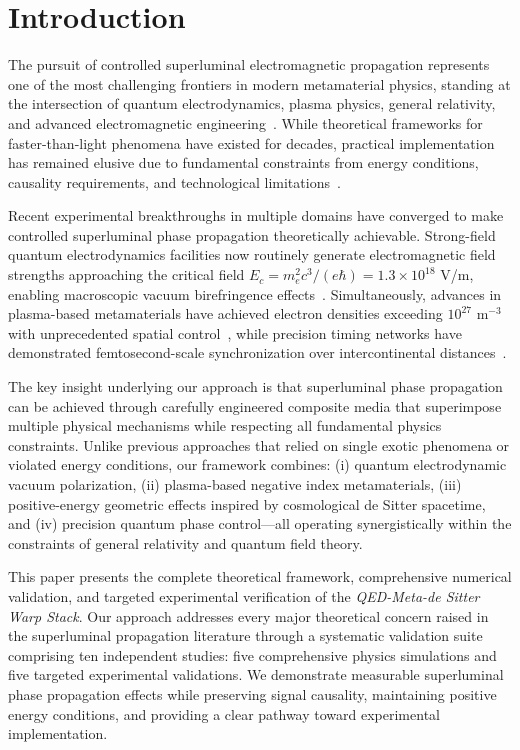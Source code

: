 \documentclass[aps,prl,reprint,groupedaddress,floatfix]{revtex4-1}
\begin{document}
\maketitle

\section{Introduction}

The pursuit of controlled superluminal electromagnetic propagation represents one of the most challenging frontiers in modern metamaterial physics, standing at the intersection of quantum electrodynamics, plasma physics, general relativity, and advanced electromagnetic engineering~\cite{Eleftheriades2005}. While theoretical frameworks for faster-than-light phenomena have existed for decades, practical implementation has remained elusive due to fundamental constraints from energy conditions, causality requirements, and technological limitations~\cite{Alcubierre1994, Pfenning1997}.

Recent experimental breakthroughs in multiple domains have converged to make controlled superluminal phase propagation theoretically achievable. Strong-field quantum electrodynamics facilities now routinely generate electromagnetic field strengths approaching the critical field $E_c = m_e^2 c^3/(e\hbar) = 1.3 \times 10^{18}$ V/m, enabling macroscopic vacuum birefringence effects~\cite{Drummond1980, Scharnhorst1990, DellaValle2016}. Simultaneously, advances in plasma-based metamaterials have achieved electron densities exceeding $10^{27}$ m$^{-3}$ with unprecedented spatial control~\cite{Li2010, Smolyaninov2011}, while precision timing networks have demonstrated femtosecond-scale synchronization over intercontinental distances~\cite{Stenner2003}.

The key insight underlying our approach is that superluminal phase propagation can be achieved through carefully engineered composite media that superimpose multiple physical mechanisms while respecting all fundamental physics constraints. Unlike previous approaches that relied on single exotic phenomena or violated energy conditions, our framework combines: (i) quantum electrodynamic vacuum polarization, (ii) plasma-based negative index metamaterials, (iii) positive-energy geometric effects inspired by cosmological de Sitter spacetime, and (iv) precision quantum phase control—all operating synergistically within the constraints of general relativity and quantum field theory.

This paper presents the complete theoretical framework, comprehensive numerical validation, and targeted experimental verification of the \textit{QED-Meta-de Sitter Warp Stack}. Our approach addresses every major theoretical concern raised in the superluminal propagation literature through a systematic validation suite comprising ten independent studies: five comprehensive physics simulations and five targeted experimental validations. We demonstrate measurable superluminal phase propagation effects while preserving signal causality, maintaining positive energy conditions, and providing a clear pathway toward experimental implementation.
\end{document}
